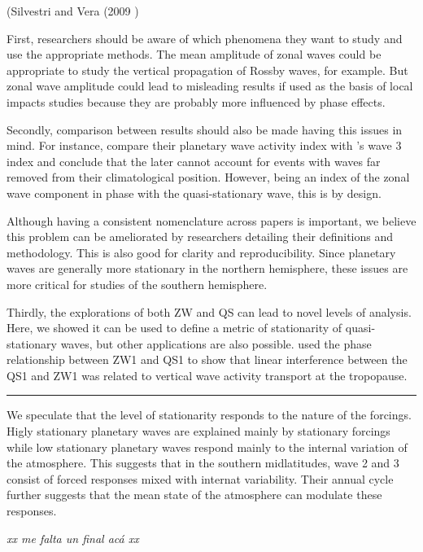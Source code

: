 \documentclass[draft,linenumbers]{agujournal2018}
\begin{document}
(Silvestri and Vera (2009 )

First, researchers should be aware of which phenomena they want to study
and use the appropriate methods. The mean amplitude of zonal waves could
be appropriate to study the vertical propagation of Rossby waves, for
example. But zonal wave amplitude could lead to misleading results if
used as the basis of local impacts studies because they are probably
more influenced by phase effects.

Secondly, comparison between results should also be made having this
issues in mind. For instance, \citet{Irving2015} compare their planetary
wave activity index with \citet{Raphael2004}'s wave 3 index and conclude
that the later cannot account for events with waves far removed from
their climatological position. However, being an index of the zonal wave
component in phase with the quasi-stationary wave, this is by design.

Although having a consistent nomenclature across papers is important, we
believe this problem can be ameliorated by researchers detailing their
definitions and methodology. This is also good for clarity and
reproducibility. Since planetary waves are generally more stationary in
the northern hemisphere, these issues are more critical for studies of
the southern hemisphere.

Thirdly, the explorations of both ZW and QS can lead to novel levels of
analysis. Here, we showed it can be used to define a metric of
stationarity of quasi-stationary waves, but other applications are also
possible. \citet{Smith2012} used the phase relationship between ZW1 and
QS1 to show that linear interference between the QS1 and ZW1 was related
to vertical wave activity transport at the tropopause.

\begin{center}\rule{0.5\linewidth}{\linethickness}\end{center}

We speculate that the level of stationarity responds to the nature of
the forcings. Higly stationary planetary waves are explained mainly by
stationary forcings while low stationary planetary waves respond mainly
to the internal variation of the atmosphere. This suggests that in the
southern midlatitudes, wave 2 and 3 consist of forced responses mixed
with internat variability. Their annual cycle further suggests that the
mean state of the atmosphere can modulate these responses.

\emph{xx me falta un final acá xx}


\end{document}
